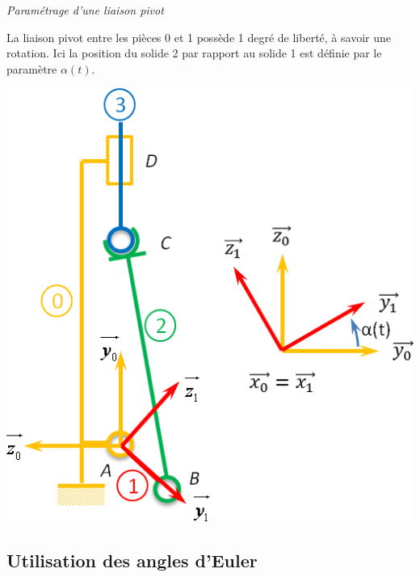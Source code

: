 \documentclass[10pt,oneside]{article}
\begin{document}
\begin{exemple}
\textit{Paramétrage d'une liaison pivot}

\begin{minipage}[c]{.45\linewidth}
La liaison pivot entre les pièces 0 et 1 possède 1 degré de liberté, à savoir une rotation. Ici la position du solide 2 par rapport au solide 1 est définie par le paramètre $\alpha(t)$.
\end{minipage} \hfill
\begin{minipage}[c]{.5\linewidth}
\begin{center}
\includegraphics[width=.95\textwidth]{png/pivot_p}
\end{center}
\end{minipage}
\end{exemple}

\subsection{Utilisation des angles d'Euler}
\end{document}
